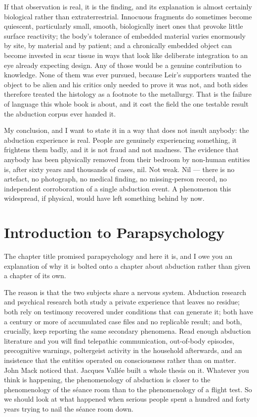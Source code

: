 If that observation is real, it is the finding, and its explanation is almost certainly biological
rather than extraterrestrial. Innocuous fragments do sometimes become quiescent, particularly small,
smooth, biologically inert ones that provoke little surface reactivity; the body's tolerance of
embedded material varies enormously by site, by material and by patient; and a chronically
embedded object can become invested in scar tissue in ways that look like deliberate integration to
an eye already expecting design. Any of those would be a genuine contribution to knowledge. None of
them was ever pursued, because Leir's supporters wanted the object to be alien and his critics only
needed to prove it was not, and both sides therefore treated the histology as a footnote to the
metallurgy.  That is the failure of language this whole book is about, and it cost
the field the one testable result the abduction corpus ever handed it.

My conclusion, and I want to state it in a way that does not insult anybody: the abduction
experience is real. People are genuinely experiencing something, it frightens them badly, and
it is not fraud and not madness. The evidence that anybody has been physically removed from
their bedroom by non-human entities is, after sixty years and thousands of cases, nil. Not
weak. Nil --- there is no artefact, no photograph, no medical finding, no missing-person
record, no independent corroboration of a single abduction event. A phenomenon this widespread,
if physical, would have left something behind by now.

\section{Introduction to Parapsychology}\label{sec:parapsych}

The chapter title promised parapsychology and here it is, and I owe you an explanation of why it is
bolted onto a chapter about abduction rather than given a chapter of its own.

The reason is that the two subjects share a nervous system. Abduction research and psychical
research both study a private experience that leaves no residue; both rely on testimony recovered
under conditions that can generate it; both have a century or more of accumulated case files and no
replicable result; and both, crucially, keep reporting the same secondary phenomena. Read enough
abduction literature and you will find telepathic communication, out-of-body episodes, precognitive
warnings, poltergeist activity in the household afterwards, and an insistence that the entities
operated on consciousness rather than on matter. John Mack noticed that. Jacques Vall\'ee built a
whole thesis on it. Whatever you think is happening, the phenomenology of abduction is closer to
the phenomenology of the s\'eance room than to the phenomenology of a flight test. So we should
look at what happened when serious people spent a hundred and forty years trying to nail the
s\'eance room down.

